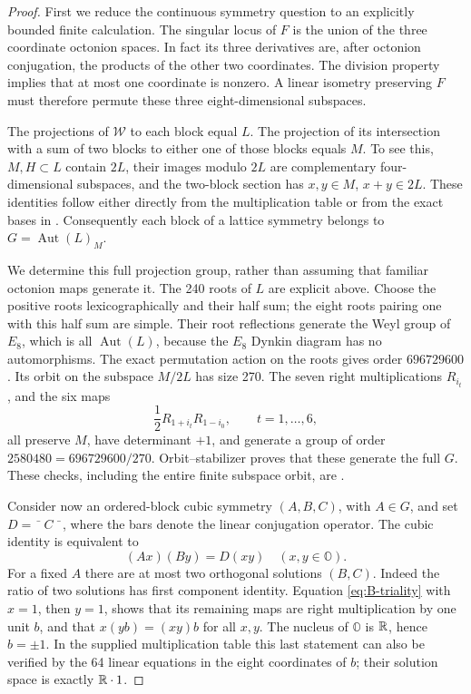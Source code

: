 \begin{proof}
First we reduce the continuous symmetry question to an explicitly
bounded finite calculation. The singular locus of \(F\) is the union
of the three coordinate octonion spaces. In fact its three derivatives
are, after octonion conjugation, the products of the other two
coordinates. The division property implies that at most one
coordinate is nonzero. A linear isometry preserving \(F\) must
therefore permute these three eight-dimensional subspaces.

The projections of \(\mathcal W\) to each block equal \(L\).
The projection of its intersection with a sum of two blocks to either
one of those blocks equals \(M\). To see this, \(M,H\subset L\)
contain \(2L\), their images modulo \(2L\) are complementary
four-dimensional subspaces, and the two-block section has
\(x,y\in M\), \(x+y\in2L\). These identities follow either directly
from the multiplication table or from the exact bases in
. Consequently each block of a
lattice symmetry belongs to \(G=\operatorname{Aut}(L)_M\).

We determine this full projection group, rather than assuming that
familiar octonion maps generate it. The 240 roots of \(L\) are
explicit above. Choose the positive roots lexicographically and their
half sum; the eight roots pairing one with this half sum are simple.
Their root reflections generate the Weyl group of \(E_8\), which is
all \(\operatorname{Aut}(L)\), because the \(E_8\) Dynkin diagram
has no automorphisms. The exact permutation action on the roots gives
order \(696729600\). Its orbit on the subspace \(M/2L\) has size
270. The seven right multiplications \(R_{i_t}\), and the six maps
\[
 \frac12 R_{1+i_t}R_{1-i_0},\qquad t=1,\ldots,6,
\]
all preserve \(M\), have determinant \(+1\), and generate a group
of order \(2580480=696729600/270\). Orbit--stabilizer proves that
these generate the full \(G\). These checks, including the entire
finite subspace orbit, are .

Consider now an ordered-block cubic symmetry \((A,B,C)\), with
\(A\in G\), and set \(D=\bar{\phantom{x}}\,C\,\bar{\phantom{x}}\),
where the bars denote the linear conjugation operator. The cubic
identity is equivalent to
\begin{equation}\label{eq:B-triality}
 (Ax)(By)=D(xy)\quad(x,y\in\mathbb O).
\end{equation}
For a fixed \(A\) there are at most two orthogonal solutions
\((B,C)\). Indeed the ratio of two solutions has first component
identity. Equation \eqref{eq:B-triality} with \(x=1\), then \(y=1\),
shows that its remaining maps are right multiplication by one unit
\(b\), and that \(x(yb)=(xy)b\) for all \(x,y\). The nucleus of
\(\mathbb O\) is \(\mathbb R\), hence \(b=\pm1\). In the supplied
multiplication table this last statement can also be verified by the
64 linear equations in the eight coordinates of \(b\); their
solution space is exactly \(\mathbb R\cdot1\).


\end{proof}
